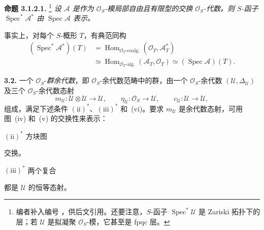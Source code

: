 \medskip
\noindent\textbf{命题 3.1.2.1.}
\label{sga3:VIIA:3.1.2.1}
\footnote{编者补入编号 ，供后文引用。还要注意，\(S\)-函子 \(\operatorname{Spec}^{*}\mathcal U\) 是 Zariski 拓扑下的层；若 \(\mathcal U\) 是拟凝聚 \(\mathcal O_S\)-模，它甚至是 fpqc 层。}
\textit{设 \(\mathcal A\) 是作为 \(\mathcal O_S\)-模局部自由且有限型的交换 \(\mathcal O_S\)-代数。则 \(S\)-函子 \(\operatorname{Spec}^{*}\mathcal A^{*}\) 由 \(\operatorname{Spec}\mathcal A\) 表示。}

事实上，对每个 \(S\)-概形 \(T\)，有典范同构
\[
  \begin{aligned}
  (\operatorname{Spec}^{*}\mathcal A^{*})(T)
  &=
  \operatorname{Hom}_{\mathcal O_T\text{-coalg.}}
    (\mathcal O_T,\mathcal A_T^{*})                                      \\
  &\simeq
  \operatorname{Hom}_{\mathcal O_T\text{-alg.}}
    (\mathcal A_T,\mathcal O_T)
  \simeq
  (\operatorname{Spec}\mathcal A)(T).
  \end{aligned}
\]

\medskip
\noindent\textbf{3.2.}
\label{sga3:VIIA:3.2}
一个 \(\mathcal O_S\)-\emph{群余代数}，即 \(\mathcal O_S\)-余代数范畴中的群，由一个 \(\mathcal O_S\)-余代数 \((\mathcal U,\Delta_{\mathcal U})\) 及三个 \(\mathcal O_S\)-余代数态射
\[
  m_{\mathcal U}:\mathcal U\otimes\mathcal U\longrightarrow\mathcal U,
  \qquad
  \eta_{\mathcal U}:\mathcal O_S\longrightarrow\mathcal U,
  \qquad
  c_{\mathcal U}:\mathcal U\longrightarrow\mathcal U,
\]
组成，满足下述条件 \((\mathrm{ii})^{*}\)、\((\mathrm{iii})^{*}\) 和~(vi)。要求 \(m_{\mathcal U}\) 是余代数态射，可用图~(iv) 和~(v) 的交换性来表示：
\begin{center}
  \label{sga3:VIIA:3.2-compatibility-iv-v}
  
\end{center}

\noindent
\((\mathrm{ii})^{*}\) 方块图
\begin{center}
  \label{sga3:VIIA:3.2-associativity-ii-star}
  
\end{center}
交换。

\noindent
\((\mathrm{iii})^{*}\) 两个复合
\begin{center}
  \label{sga3:VIIA:3.2-unit-sequences-iii-star}
  
\end{center}
都是 \(\mathcal U\) 的恒等态射。

